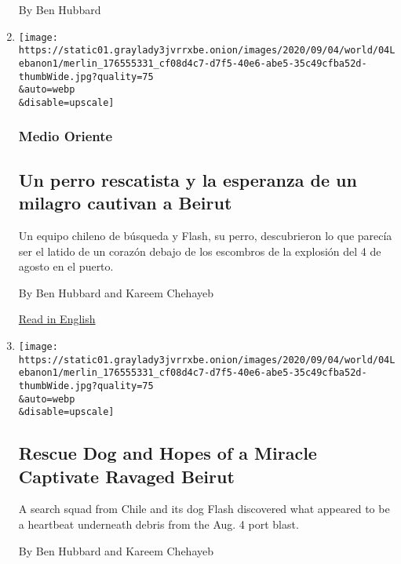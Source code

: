 \begin{enumerate}
  By Ben Hubbard
\item
  \href{/es/2020/09/04/espanol/mundo/libano-rescate-topos.html}{}

  \texttt{[image: https://static01.graylady3jvrrxbe.onion/images/2020/09/04/world/04Lebanon1/merlin\_176555331\_cf08d4c7-d7f5-40e6-abe5-35c49cfba52d-thumbWide.jpg?quality=75\\\&auto=webp\\\&disable=upscale]}

  \hypertarget{medio-oriente}{%
  \subsubsection{Medio Oriente}\label{medio-oriente}}

  \hypertarget{un-perro-rescatista-y-la-esperanza-de-un-milagro-cautivan-a-beirut}{%
  \subsection{Un perro rescatista y la esperanza de un milagro cautivan
  a
  Beirut}\label{un-perro-rescatista-y-la-esperanza-de-un-milagro-cautivan-a-beirut}}

  Un equipo chileno de búsqueda y Flash, su perro, descubrieron lo que
  parecía ser el latido de un corazón debajo de los escombros de la
  explosión del 4 de agosto en el puerto.

  By Ben Hubbard and Kareem Chehayeb

  \href{https://www.nytimes3xbfgragh.onion/2020/09/04/world/middleeast/Beirut-survivor-search.html}{Read
  in English}
\item
  \href{/2020/09/04/world/middleeast/Beirut-survivor-search.html}{}

  \texttt{[image: https://static01.graylady3jvrrxbe.onion/images/2020/09/04/world/04Lebanon1/merlin\_176555331\_cf08d4c7-d7f5-40e6-abe5-35c49cfba52d-thumbWide.jpg?quality=75\\\&auto=webp\\\&disable=upscale]}

  \hypertarget{rescue-dog-and-hopes-of-a-miracle-captivate-ravaged-beirut}{%
  \subsection{Rescue Dog and Hopes of a Miracle Captivate Ravaged
  Beirut}\label{rescue-dog-and-hopes-of-a-miracle-captivate-ravaged-beirut}}

  A search squad from Chile and its dog Flash discovered what appeared
  to be a heartbeat underneath debris from the Aug. 4 port blast.

  By Ben Hubbard and Kareem Chehayeb


\end{enumerate}
